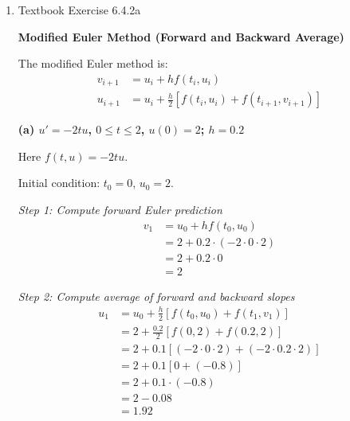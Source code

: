 \documentclass[reqno, answers]{exam}
\begin{document}
\begin{enumerate}
\begin{solution}
          \textbf{Result:} $\boxed{u_1 = 1.92}$ at $t_1 = 0.2$

          \textit{Comparison with exact solution:}
          \begin{align*}
            \hat{u}(0.2) = 2e^{-(0.2)^2} = 2e^{-0.04} \approx 1.9216
          \end{align*}

          Error: $|u_1 - \hat{u}(0.2)| = |1.92 - 1.9216| = 0.0016$
        \end{solution}
  \item Textbook Exercise 6.4.2a
        \begin{solution}
          \textbf{Modified Euler Method (Forward and Backward Average)}

          The modified Euler method is:
          \begin{align*}
            v_{i+1} & = u_i + h f(t_i, u_i)                                   \\
            u_{i+1} & = u_i + \frac{h}{2} [f(t_i, u_i) + f(t_{i+1}, v_{i+1})]
          \end{align*}

          \medskip

          \textbf{(a) $u' = -2tu$, $0 \leq t \leq 2$, $u(0) = 2$; $h = 0.2$}

          Here $f(t,u) = -2tu$.

          Initial condition: $t_0 = 0$, $u_0 = 2$.

          \textit{Step 1: Compute forward Euler prediction}
          \begin{align*}
            v_1 & = u_0 + h f(t_0, u_0)                \\
                & = 2 + 0.2 \cdot (-2 \cdot 0 \cdot 2) \\
                & = 2 + 0.2 \cdot 0                    \\
                & = 2
          \end{align*}

          \textit{Step 2: Compute average of forward and backward slopes}
          \begin{align*}
            u_1 & = u_0 + \frac{h}{2} [f(t_0, u_0) + f(t_1, v_1)]           \\
                & = 2 + \frac{0.2}{2} [f(0, 2) + f(0.2, 2)]                 \\
                & = 2 + 0.1 [(-2 \cdot 0 \cdot 2) + (-2 \cdot 0.2 \cdot 2)] \\
                & = 2 + 0.1 [0 + (-0.8)]                                    \\
                & = 2 + 0.1 \cdot (-0.8)                                    \\
                & = 2 - 0.08                                                \\
                & = 1.92
          \end{align*}


\end{solution}
\end{enumerate}
\end{document}
